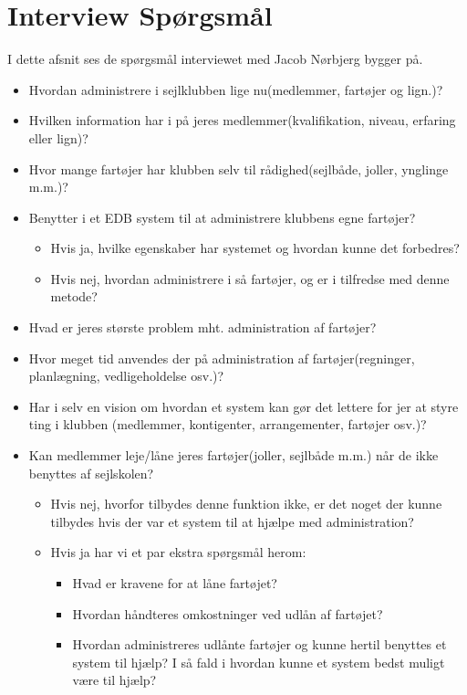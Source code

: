 \chapter{Interview Spørgsmål} \label{questions}
I dette afsnit ses de spørgsmål interviewet med Jacob Nørbjerg bygger på.

\begin{itemize}
\item Hvordan administrere i sejlklubben lige nu(medlemmer, fartøjer og lign.)?
\item Hvilken information har i på jeres medlemmer(kvalifikation, niveau, erfaring eller lign)?
\item Hvor mange fartøjer har klubben selv til rådighed(sejlbåde, joller, ynglinge m.m.)?
\item Benytter i et EDB system til at administrere klubbens egne fartøjer?
	\begin{itemize}
	\item Hvis ja, hvilke egenskaber har systemet og hvordan kunne det forbedres?
	\item Hvis nej, hvordan administrere i så fartøjer, og er i tilfredse med denne metode?
	\end{itemize}
\item Hvad er jeres største problem mht. administration af fartøjer?
\item Hvor meget tid anvendes der på administration af fartøjer(regninger, planlægning, vedligeholdelse osv.)?
\item Har i selv en vision om hvordan et system kan gør det lettere for jer at styre ting i klubben (medlemmer, kontigenter, arrangementer, fartøjer osv.)?
\item Kan medlemmer leje/låne jeres fartøjer(joller, sejlbåde m.m.) når de ikke benyttes af sejlskolen?
	\begin{itemize}
	\item Hvis nej, hvorfor tilbydes denne funktion ikke, er det noget der kunne tilbydes hvis der var et system til at hjælpe med administration?
	\item Hvis ja har vi et par ekstra spørgsmål herom:
		\begin{itemize}
		\item Hvad er kravene for at låne fartøjet?
		\item Hvordan håndteres omkostninger ved udlån af fartøjet?
		\item Hvordan administreres udlånte fartøjer og kunne hertil benyttes et system til hjælp? I så fald i hvordan kunne et system bedst muligt være til hjælp?
		\end{itemize}
	\end{itemize}
\end{itemize}
